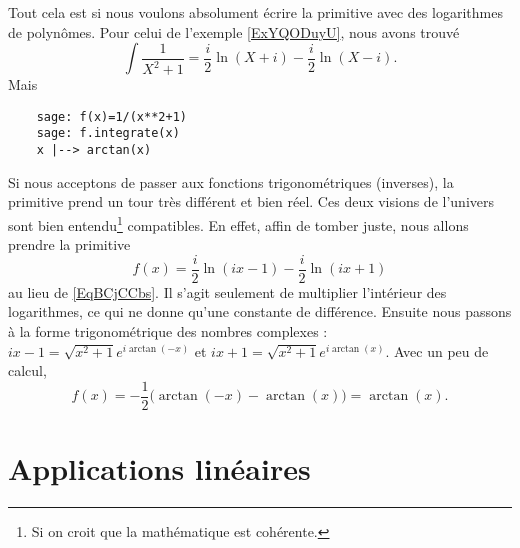 \begin{remark}
    Tout cela est si nous voulons absolument écrire la primitive avec des logarithmes de polynômes. Pour celui de l'exemple \ref{ExYQODuyU}, nous avons trouvé
    \begin{equation}    \label{EqBCjCCbs}
        \int\frac{1}{ X^2+1 }=\frac{ i }{2}\ln(X+i)-\frac{ i }{2}\ln(X-i).
    \end{equation}
    Mais
    \begin{verbatim}
    sage: f(x)=1/(x**2+1)                                                                                                                      
    sage: f.integrate(x)
    x |--> arctan(x)
    \end{verbatim}
    Si nous acceptons de passer aux fonctions trigonométriques (inverses), la primitive prend un tour très différent et bien réel. Ces deux visions de l'univers sont bien entendu\footnote{Si on croit que la mathématique est cohérente.} compatibles. En effet, affin de tomber juste, nous allons prendre la primitive
    \begin{equation}
        f(x)=\frac{ i }{2}\ln(ix-1)-\frac{ i }{2}\ln(ix+1)
    \end{equation}
    au lieu de \eqref{EqBCjCCbs}. Il s'agit seulement de multiplier l'intérieur des logarithmes, ce qui ne donne qu'une constante de différence. Ensuite nous passons à la forme trigonométrique des nombres complexes : \( ix-1=\sqrt{x^2+1} e^{i\arctan(-x)}\) et \( ix+1=\sqrt{x^2+1} e^{i\arctan(x)}\). Avec un peu de calcul,
    \begin{equation}
        f(x)=-\frac{ 1 }{2}\Big( \arctan(-x)-\arctan(x) \Big)=\arctan(x).
    \end{equation}
\end{remark}


\section{Applications linéaires}

